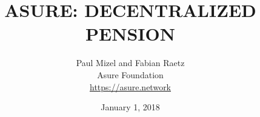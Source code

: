
\title{ASURE: DECENTRALIZED PENSION}
\author{Paul Mizel and Fabian Raetz \\
Asure Foundation \\ 
\url{https://asure.network}}
\date{January 1, 2018}
\maketitle

